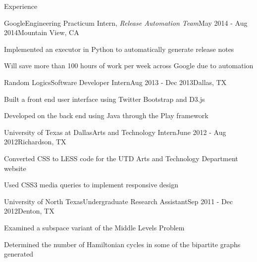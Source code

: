 \documentclass{resume} %
\begin{document}
\begin{rSection}{Experience}

\begin{job_section}{Google}{Engineering Practicum Intern, {\em Release Automation Team}}{May 2014 - Aug 2014}{Mountain View, CA}
\item Implemented an executor in Python to automatically generate release notes
\item Will save more than 100 hours of work per week across Google due to automation
\end{job_section}

\begin{job_section}{Random Logics}{Software Developer Intern}{Aug 2013 - Dec 2013}{Dallas, TX}
\item Built a front end user interface using Twitter Bootstrap and D3.js
\item Developed on the back end using Java through the Play framework
\end{job_section}

\begin{job_section}{University of Texas at Dallas}{Arts and Technology Intern}{June 2012 - Aug 2012}{Richardson, TX}
\item Converted CSS to LESS code for the UTD Arts and Technology Department website
\item Used CSS3 media queries to implement responsive design
\end{job_section}

\begin{job_section}{University of North Texas}{Undergraduate Research Assistant}{Sep 2011 - Dec 2012}{Denton, TX}
\item Examined a subspace variant of the Middle Levels Problem
\item Determined the number of Hamiltonian cycles in some of the bipartite graphs generated
\end{job_section}

\end{rSection}

\end{document}
